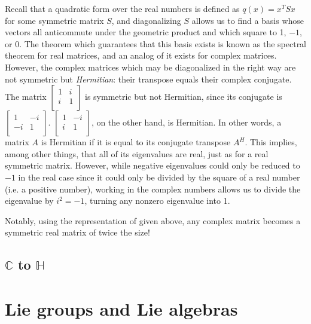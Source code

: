 \documentclass{article}
\begin{document}
Recall that a quadratic form over the real numbers
is defined as $q(x) = x^TSx$ for some symmetric matrix $S$,
and diagonalizing $S$ allows us to find a basis
whose vectors all anticommute under the geometric product
and which square to 1, $-1$, or 0.
The theorem which guarantees that this basis exists
is known as the spectral theorem for real matrices,
and an analog of it exists for complex matrices.
However, the complex matrices which may be diagonalized in the right way
are not symmetric but \textit{Hermitian}:
their transpose equals their complex conjugate.
The matrix
$\begin{bmatrix}
  1 & i \\
  i & 1 \\
\end{bmatrix}$
is symmetric but not Hermitian,
since its conjugate is
$\begin{bmatrix}
  1 & -i \\
  -i & 1 \\
\end{bmatrix}$.
$\begin{bmatrix}
  1 & -i \\
  i & 1 \\
\end{bmatrix}$,
on the other hand, is Hermitian.
In other words, a matrix $A$ is Hermitian
if it is equal to its conjugate transpose $A^H$.
This implies, among other things,
that all of its eigenvalues are real,
just as for a real symmetric matrix.
However, while negative eigenvalues could only be reduced to $-1$ in the real case
since it could only be divided by the square of a real number (i.e. a positive number),
working in the complex numbers allows us to divide the eigenvalue by $i^2=-1$,
turning any nonzero eigenvalue into 1.


Notably, using the representation of given above,
any complex matrix becomes a symmetric real matrix of twice the size!



\subsection{\texorpdfstring{$\mathbb{C}$}{C} to \texorpdfstring{$\mathbb{H}$}{H}}

\section{Lie groups and Lie algebras}
\end{document}
